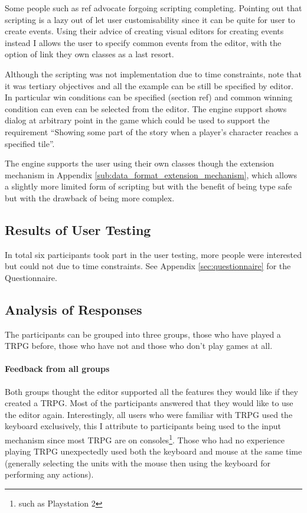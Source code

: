 Some people such as ref  advocate forgoing scripting completing. Pointing out that scripting is a lazy out of let user customisability since it can be quite for user to create events.  Using their advice of creating visual editors for creating events instead I allows the user to specify common events from the editor, with the option of link they own classes as a last resort. 

Although the scripting was not implementation due to time constraints, note that it was  tertiary objectives and all the example can be still be specified by editor. In particular win conditions can be specified (section ref) and common winning condition can even can be selected from the editor.  The engine support shows dialog at arbitrary point in the game which could be used to support the requirement ``Showing some part of the story when a player’s character reaches a specified tile''.

The engine supports the user using their own classes though the extension mechanism in Appendix \ref{sub:data_format_extension_mechanism}, which allows a slightly more limited form of scripting but with the benefit of being type safe but with the drawback of being  more complex.

% 

\subsection{Results of User Testing}
In total six participants took part in the user testing, more people were interested but could not due to time constraints.  See Appendix \ref{sec:questionnaire} for the Questionnaire.

\subsection{Analysis of Responses}
The participants can be grouped into three groups, those who have played a TRPG before, those who have not and those who don't play games at all.
\paragraph{Feedback from  all groups\\}
Both groups thought the editor supported all the features they would like if they created a TRPG.  Most of the participants answered that they would like to use the editor again.  Interestingly, all users who were familiar with TRPG used the keyboard exclusively, this I attribute to participants being used to the input mechanism since most TRPG are on consoles\footnote{such as Playstation 2}. Those who had no experience playing TRPG unexpectedly used both the keyboard and mouse at the same time (generally selecting the units with the mouse then using the keyboard for performing any actions).

